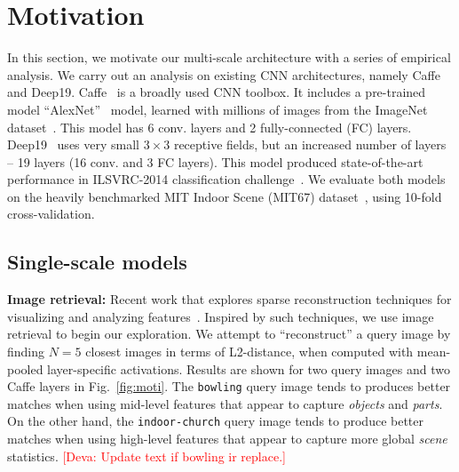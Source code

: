 \documentclass[10pt,twocolumn,letterpaper]{article}
\newcommand{\deva}[1]{\textcolor{red}{[Deva: #1]}}
\begin{document}


\section{Motivation\label{sec:motivation}}

In this section, we motivate our multi-scale architecture with a series of empirical analysis. We carry out an analysis on existing CNN architectures, namely Caffe and Deep19. Caffe~\cite{Caffe} is a broadly used CNN toolbox. It includes a pre-trained model ``AlexNet''~\cite{AlexNet} model, learned with millions of images from the ImageNet dataset~\cite{ImageNet}. This model has 6 conv. layers and 2 fully-connected (FC) layers. Deep19~\cite{veryDeep} uses very small $3\times 3$ receptive fields, but an increased number of layers -- 19 layers (16 conv. and 3 FC layers). This model produced state-of-the-art performance in ILSVRC-2014 classification challenge~\cite{ILSVRC14}. We evaluate both models on the heavily benchmarked MIT Indoor Scene (MIT67) dataset~\cite{MIT67}, using 10-fold cross-validation.

\subsection{Single-scale models} 

{\bf Image retrieval:} Recent work that explores sparse reconstruction techniques for visualizing and analyzing features~\cite{vondrick2013hoggles}. Inspired by such techniques, we use image retrieval to begin our exploration. We attempt to ``reconstruct'' a query image by finding $N=5$ closest images in terms of L2-distance, when computed with mean-pooled layer-specific activations. Results are shown for two query images and two Caffe layers in Fig.~\ref{fig:moti}. The {\tt bowling} query image tends to produces better matches when using mid-level features that appear to capture \textit{objects} and \textit{parts}. On the other hand, the {\tt indoor-church} query image tends to produce better matches when using high-level features that appear to capture more global \textit{scene} statistics. \deva{Update text if bowling ir replace.}
\end{document}
